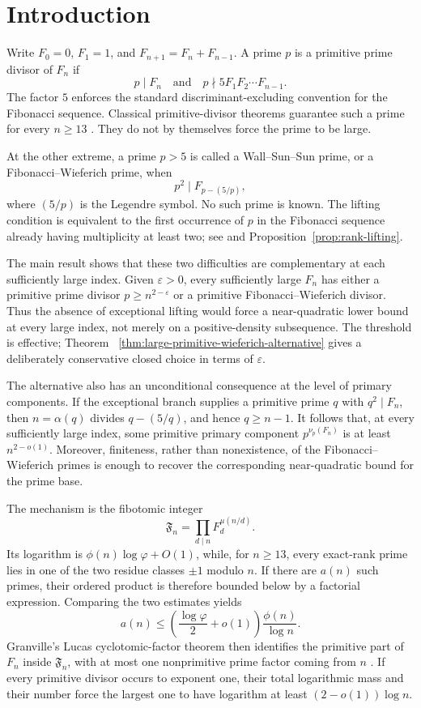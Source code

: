 \section{Introduction}
\label{sec:introduction}

Write $F_0=0$, $F_1=1$, and $F_{n+1}=F_n+F_{n-1}$.  A prime $p$ is a
primitive prime divisor of $F_n$ if
\[
 p\mid F_n
 \quad\text{and}\quad
 p\nmid 5F_1F_2\cdots F_{n-1}.
\]
The factor $5$ enforces the standard discriminant-excluding convention for
the Fibonacci sequence.  Classical primitive-divisor theorems guarantee
such a prime for every $n\geq13$
\cite{Carmichael1913PrimitiveDivisors,Yabuta2001PrimitiveDivisorFibonacci,
BiluHanrotVoutier2001PrimitiveDivisorsLucas}.  They do not by themselves
force the prime to be large.

At the other extreme, a prime $p>5$ is called a Wall--Sun--Sun prime, or a
Fibonacci--Wieferich prime, when
\[
 p^2\mid F_{p-(5/p)},
\]
where $(5/p)$ is the Legendre symbol.  No such prime is known.  The lifting
condition is equivalent to the first occurrence of $p$ in the Fibonacci
sequence already having multiplicity at least two; see
\cite{Klaska2018WallConjecture} and Proposition~\ref{prop:rank-lifting}.

The main result shows that these two difficulties are complementary at each
sufficiently large index.  Given $\varepsilon>0$, every sufficiently large
$F_n$ has either a primitive prime divisor $p\geq n^{2-\varepsilon}$ or a
primitive Fibonacci--Wieferich divisor.  Thus the absence of exceptional
lifting would force a near-quadratic lower bound at every large index, not
merely on a positive-density subsequence.
The threshold is effective; Theorem~
\ref{thm:large-primitive-wieferich-alternative} gives a deliberately
conservative closed choice in terms of $\varepsilon$.

The alternative also has an unconditional consequence at the level of
primary components.  If the exceptional branch supplies a primitive prime
$q$ with $q^2\mid F_n$, then $n=\alpha(q)$ divides $q-(5/q)$, and hence
$q\geq n-1$.  It follows that, at every sufficiently large index, some
primitive primary component $p^{\nu_p(F_n)}$ is at least $n^{2-o(1)}$.
Moreover, finiteness, rather than nonexistence, of the
Fibonacci--Wieferich primes is enough to recover the corresponding
near-quadratic bound for the prime base.

The mechanism is the fibotomic integer
\[
 \mathfrak F_n=\prod_{d\mid n}F_d^{\mu(n/d)}.
\]
Its logarithm is $\phi(n)\log\varphi+O(1)$, while, for $n\geq13$, every
exact-rank prime lies in one of the two residue classes $\pm1$ modulo $n$.  If there are
$a(n)$ such primes, their ordered product is therefore bounded below by a
factorial expression.  Comparing the two estimates yields
\[
 a(n)\leq
 \left(\frac{\log\varphi}{2}+o(1)\right)
 \frac{\phi(n)}{\log n}.
\]
Granville's Lucas cyclotomic-factor theorem then identifies the primitive
part of $F_n$ inside $\mathfrak F_n$, with at most one nonprimitive prime
factor coming from $n$ \cite{Granville2012PrimitivePrimeFactors}.  If every
primitive divisor occurs to exponent one, their total logarithmic mass and
their number force the largest one to have logarithm at least
$(2-o(1))\log n$.


